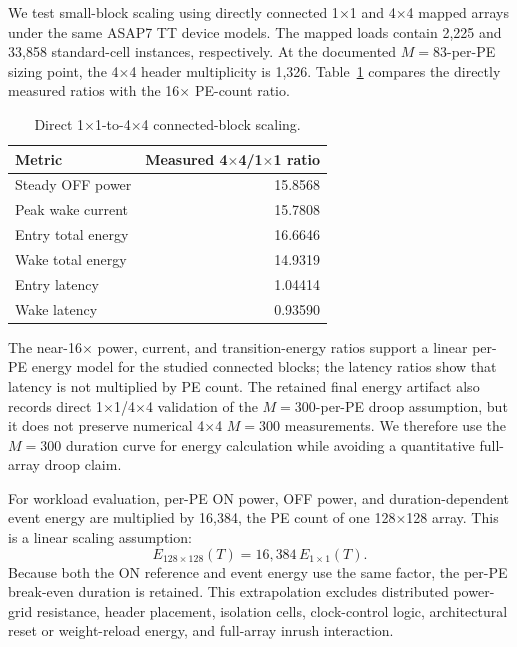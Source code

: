 We test small-block scaling using directly connected 1$\times$1 and
4$\times$4 mapped arrays under the same ASAP7 TT device models.  The mapped
loads contain 2,225 and 33,858 standard-cell instances, respectively.  At the
documented $M=83$-per-PE sizing point, the 4$\times$4 header multiplicity is
1,326.  Table~\ref{tab:connected-scaling} compares the directly measured
ratios with the 16$\times$ PE-count ratio.

\begin{table}[t]
  \centering
  \caption{Direct 1$\times$1-to-4$\times$4 connected-block scaling.}
  \label{tab:connected-scaling}
  \begin{tabular}{lr}
    \toprule
    Metric & Measured 4$\times$4/1$\times$1 ratio \\
    \midrule
    Steady OFF power & 15.8568 \\
    Peak wake current & 15.7808 \\
    Entry total energy & 16.6646 \\
    Wake total energy & 14.9319 \\
    Entry latency & 1.04414 \\
    Wake latency & 0.93590 \\
    \bottomrule
  \end{tabular}
\end{table}

The near-16$\times$ power, current, and transition-energy ratios support a
linear per-PE energy model for the studied connected blocks; the latency
ratios show that latency is not multiplied by PE count.  The retained final
energy artifact also records direct 1$\times$1/4$\times$4 validation of the
$M=300$-per-PE droop assumption, but it does not preserve numerical 4$\times$4
$M=300$ measurements.  We therefore use the $M=300$ duration curve for energy
calculation while avoiding a quantitative full-array droop claim.

For workload evaluation, per-PE ON power, OFF power, and duration-dependent
event energy are multiplied by 16,384, the PE count of one 128$\times$128
array.  This is a linear scaling assumption:
\begin{equation}
  E_{128\times128}(T)=16{,}384\,E_{1\times1}(T).
  \label{eq:per-pe-energy-scaling}
\end{equation}
Because both the ON reference and event energy use the same factor, the
per-PE break-even duration is retained.  This extrapolation excludes
distributed power-grid resistance, header placement, isolation cells,
clock-control logic, architectural reset or weight-reload energy, and
full-array inrush interaction.

